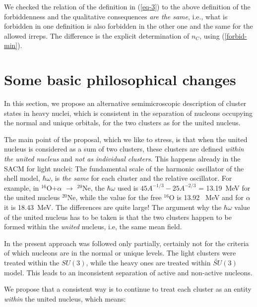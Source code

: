 \documentclass[12pt]{article}
\begin{document}
We checked the relation of the definition in (\ref{eq-3}) to the above definition
of the forbiddenness and the qualitative consequences {\it are the same}, i.e.,
what is forbidden in one definition is also forbidden in the other one and the same for the
allowed irreps. The difference is the explicit determination of $n_C$, using (\ref{forbid-min}).

\section{Some basic philosophical changes}
\label{fil}

In this section, we propose an alternative 
semimicroscopic description of cluster states in heavy nuclei,
which is consistent in the separation of nucleons occupying the normal and unique orbitals,
for the two clusters as for the united nucleus.

The main point of the proposal, which we like to stress, 
is that when the united nucleus is considered as a sum
of two clusters, these clusters are defined {\it within the united nucleus} and
{\it not as individual clusters}. This happens already in the SACM for light nuclei: The
fundamental scale of the harmonic oscillator of the shell model, $\hbar\omega$, is
{\it the same} for each cluster and the relative oscillator. For example, in
$^{16}$O+$\alpha$ $\rightarrow$ $^{20}$Ne, the $\hbar\omega$ used is 
$45 A^{-1/3}-25 A^{-2/3}$ = 13.19~MeV  \cite{hw} 
for the united nucleus $^{20}$Ne, while the value for
the free $^{16}$O is  13.92 ~MeV and for $\alpha$ it is 18.43~MeV. The differences are quite large!
The argument why the $\hbar\omega$ value of the united nucleus has to be taken is that
the two clusters happen to be formed within the {\it united} nucleus, i.e, the same mean field.

In \cite{cseh-scheid,cseh-algora}   the present approach  was followed only partially, certainly not
for the criteria of which nucleons are in the normal or unique levels. The light clusters were treated within the
$SU(3)$, while the heavy ones are treated within
$\widetilde{SU}(3)$ model.
This leads to an inconsistent separation of  active and non-active nucleons. 

We propose that a consistent way is to continue to treat each cluster as an entity 
{\it within} the united nucleus, which means:
\end{document}
